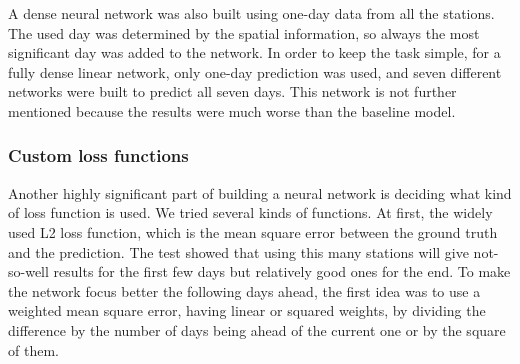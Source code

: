 \documentclass{article}
\begin{document}
A dense neural network was also built using one-day data from all the
stations. The used day was determined by the spatial information, so always
the most significant day was added to the network. In order to keep the task
simple, for a fully dense linear network, only one-day prediction was used,
and seven different networks were built to predict all seven days. This
network is not further mentioned because the results were much worse than the
baseline model.

\subsubsection{Custom loss functions}

Another highly significant part of building a neural network is deciding what
kind of loss function is used. We tried several kinds of functions. At first,
the widely used L2 loss function, which is the mean square error between the
ground truth and the prediction. The test showed that using this many stations
will give not-so-well results for the first few days but relatively good ones
for the end. To make the network focus better the following days ahead, the
first idea was to use a weighted mean square error, having linear or squared
weights, by dividing the difference by the number of days being ahead of the
current one or by the square of them.
\end{document}
